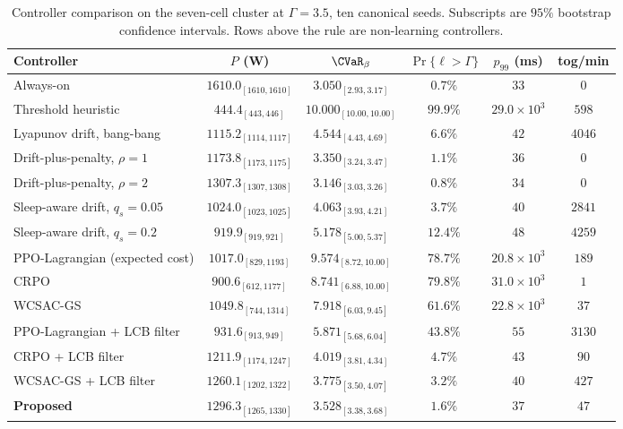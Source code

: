 \begin{table}[t]
  \centering
  \caption{Controller comparison on the seven-cell cluster at $\Gamma=3.5$, ten canonical seeds. Subscripts are $95\%$ bootstrap confidence intervals. Rows above the rule are non-learning controllers.}
  \label{tab:headline}
  \footnotesize
  \setlength{\tabcolsep}{8pt}
  \begin{tabular}{@{}lccccc@{}}
    \toprule
    Controller & $P$ (W) & $\CVaR_{\beta}$ & $\Pr\{\ell{>}\Gamma\}$ & $p_{99}$ (ms) & tog/min \\
    \midrule
    Always-on & $1610.0_{[1610,1610]}$ & $3.050_{[2.93,3.17]}$ & $0.7\%$ & $33$ & $0$ \\
    Threshold heuristic & $444.4_{[443,446]}$ & $10.000_{[10.00,10.00]}$ & $99.9\%$ & $29.0\!\times\!10^{3}$ & $598$ \\
    Lyapunov drift, bang-bang & $1115.2_{[1114,1117]}$ & $4.544_{[4.43,4.69]}$ & $6.6\%$ & $42$ & $4046$ \\
    Drift-plus-penalty, $\rho\!=\!1$ & $1173.8_{[1173,1175]}$ & $3.350_{[3.24,3.47]}$ & $1.1\%$ & $36$ & $0$ \\
    Drift-plus-penalty, $\rho\!=\!2$ & $1307.3_{[1307,1308]}$ & $3.146_{[3.03,3.26]}$ & $0.8\%$ & $34$ & $0$ \\
    Sleep-aware drift, $q_s\!=\!0.05$ & $1024.0_{[1023,1025]}$ & $4.063_{[3.93,4.21]}$ & $3.7\%$ & $40$ & $2841$ \\
    Sleep-aware drift, $q_s\!=\!0.2$ & $919.9_{[919,921]}$ & $5.178_{[5.00,5.37]}$ & $12.4\%$ & $48$ & $4259$ \\
    \midrule
    PPO-Lagrangian (expected cost) & $1017.0_{[829,1193]}$ & $9.574_{[8.72,10.00]}$ & $78.7\%$ & $20.8\!\times\!10^{3}$ & $189$ \\
    CRPO~\cite{Xu_CRPO_ICML2021} & $900.6_{[612,1177]}$ & $8.741_{[6.88,10.00]}$ & $79.8\%$ & $31.0\!\times\!10^{3}$ & $1$ \\
    WCSAC-GS~\cite{Yang_WCSAC_ML2023} & $1049.8_{[744,1314]}$ & $7.918_{[6.03,9.45]}$ & $61.6\%$ & $22.8\!\times\!10^{3}$ & $37$ \\
    PPO-Lagrangian + LCB filter & $931.6_{[913,949]}$ & $5.871_{[5.68,6.04]}$ & $43.8\%$ & $55$ & $3130$ \\
    CRPO + LCB filter & $1211.9_{[1174,1247]}$ & $4.019_{[3.81,4.34]}$ & $4.7\%$ & $43$ & $90$ \\
    WCSAC-GS + LCB filter & $1260.1_{[1202,1322]}$ & $3.775_{[3.50,4.07]}$ & $3.2\%$ & $40$ & $427$ \\
    \textbf{Proposed} & $1296.3_{[1265,1330]}$ & $3.528_{[3.38,3.68]}$ & $1.6\%$ & $37$ & $47$ \\
    \bottomrule
  \end{tabular}
\end{table}
